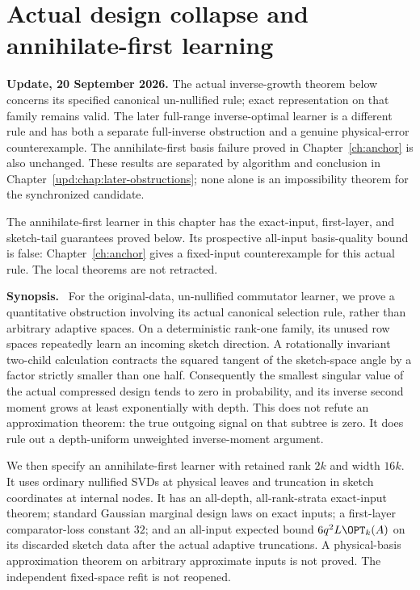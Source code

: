 \documentclass[11pt,oneside,openany,a4paper]{book}
\numberwithin{equation}{chapter}
\theoremstyle{definition}
\theoremstyle{remark}
\newenvironment{chaptersynopsis}{\begingroup\small\textbf{Synopsis.}\ }{\par\endgroup\medskip}
\begin{document}
\chapter{Actual design collapse and annihilate-first learning}\label{ch:actual}
\begin{scopebox}
\textbf{Update, 20 September 2026.} The actual inverse-growth theorem below concerns its specified canonical un-nullified rule; exact representation on that family remains valid. The later full-range inverse-optimal learner is a different rule and has both a separate full-inverse obstruction and a genuine physical-error counterexample. The annihilate-first basis failure proved in Chapter~\ref{ch:anchor} is also unchanged. These results are separated by algorithm and conclusion in Chapter~\ref{upd:chap:later-obstructions}; none alone is an impossibility theorem for the synchronized candidate.
\end{scopebox}

\begin{scopebox}
The annihilate-first learner in this chapter has the exact-input, first-layer, and sketch-tail guarantees proved below. Its prospective all-input basis-quality bound is false: Chapter~\ref{ch:anchor} gives a fixed-input counterexample for this actual rule. The local theorems are not retracted.
\end{scopebox}
\thispagestyle{plain}
\begin{chaptersynopsis}
For the original-data, un-nullified commutator learner, we prove a quantitative obstruction involving its actual canonical selection rule, rather than arbitrary adaptive spaces. On a deterministic rank-one family, its unused row spaces repeatedly learn an incoming sketch direction. A rotationally invariant two-child calculation contracts the squared tangent of the sketch-space angle by a factor strictly smaller than one half. Consequently the smallest singular value of the actual compressed design tends to zero in probability, and its inverse second moment grows at least exponentially with depth. This does not refute an approximation theorem: the true outgoing signal on that subtree is zero. It does rule out a depth-uniform unweighted inverse-moment argument.

We then specify an annihilate-first learner with retained rank $2k$ and width $16k$. It uses ordinary nullified SVDs at physical leaves and truncation in sketch coordinates at internal nodes. It has an all-depth, all-rank-strata exact-input theorem; standard Gaussian marginal design laws on exact inputs; a first-layer comparator-loss constant $32$; and an all-input expected bound $6q^2L\OPT_k(A)$ on its discarded sketch data after the actual adaptive truncations. A physical-basis approximation theorem on arbitrary approximate inputs is not proved. The independent fixed-space refit is not reopened.
\end{chaptersynopsis}
\end{document}
